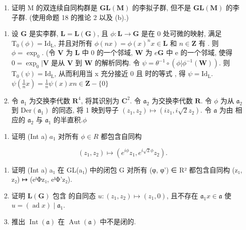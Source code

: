 \begin{enumerate}
\def\labelenumi{(\alph{enumi})}
\setcounter{enumi}{2}
\tightlist
\item
  证明 M 的双连续自同构群是 \(\mathbf{GL}(\mathbf{M})\) 的李拟子群, 但不是 \(\mathbf{GL}(\mathbf{M})\) 的李子群. (使用命题 18 的推论 2 以及 (b).)
\end{enumerate}

\begin{enumerate}
\def\labelenumi{\arabic{enumi}.}
\setcounter{enumi}{12}
\item
  设 \(\mathbf{G}\) 是实李群, \(\mathbf{L} = \mathbf{L}(\mathbf{G})\), 且 \(\phi: \mathbf{L} \to \mathbf{G}\) 是在 0 处可微的映射, 满足 \(\mathrm{T}_0(\phi) = \mathrm{Id}_{\mathrm{L}}\), 并且对所有 \(\phi(nx) = \phi(x)^n\)\(x \in \mathbf{L}\) 和 \(n \in \mathbf{Z}\) 有 . 则 \(\phi = \exp_0\). (令 \(\mathbf{V}\) 为 \(\mathbf{L}\) 中 0 的一个邻域, \(\mathbf{W}\) 为 \(e\)\(\mathbf{G}\) 中 e 的一个邻域, 使得 \(0 = \exp_0 | \mathbf{V}\) 是从 \(\mathbf{V}\) 到 \(\mathbf{W}\) 的解析同构. 令 \(\psi = \theta^{-1} \circ (\phi | \phi^{-1}(\mathbf{W}))\). 则 \(\mathrm{T}_0(\psi) = \mathrm{Id}_{\mathrm{L}}\), 从而利用当 x 充分接近 0 且  时的等式 , 得 \(\psi = \mathrm{Id}_{\mathrm{L}}\).\(\psi\left(\frac{1}{n}x\right) = \frac{1}{n}\psi(x)\)\(x\)\(n \in \mathbf{Z} - \{0\}\)
\item
  令 \(\mathfrak{a}_1\) 为交换李代数 \(\mathbf{R}^4\), 将其识别为 \(\mathbf{C}^2\). 令 \(\mathfrak{a}_2\) 为交换李代数 \(\mathbf{R}\). 令 \(\phi\) 为从 \(\mathfrak{a}_2\) 到 \(\mathrm{Der}(\mathfrak{a}_1)\) 的同态, 将 1 映到导子 \((z_1, z_2) \mapsto (iz_1, i\sqrt{2}z_2)\). 令 \(\mathfrak{a}\) 为由  相应的 \(\mathfrak{a}_2\) 与 \(\mathfrak{a}_1\) 的半直积.\(\phi\)
\end{enumerate}

\begin{enumerate}
\def\labelenumi{(\alph{enumi})}
\tightlist
\item
  证明 (Int a) \textbar{} \(a_{1}\) 对所有 \(\phi \in R\) 都包含自同构
\end{enumerate}

\[
\left(z _ {1}, z _ {2}\right) \mapsto \left(e ^ {i \phi} z _ {1}, e ^ {i \sqrt {2} \phi} z _ {2}\right).
\]

\begin{enumerate}
\def\labelenumi{(\alph{enumi})}
\setcounter{enumi}{1}
\item
  证明 (Int a) \textbar{} a₁ 在 GL(a₁) 中的闭包 G 对所有 (φ, φ') ∈ R² 都包含自同构 (z₁, z₂) ↦ (eⁱΦz₁, eⁱΦ'z₂).
\item
  证明 \(\mathbf{L}(\mathbf{G})\) 包含  的自同态 \(u: (z_1, z_2) \mapsto (z_1, 0)\), 且不存在 \(\mathfrak{a}_1\)\(x \in \mathfrak{a}\) 使 \(u = (\operatorname{ad} x) \mid \mathfrak{a}_1\).
\item
  推出 \(\operatorname{Int}(\mathfrak{a})\) 在 \(\operatorname{Aut}(\mathfrak{a})\) 中不是闭的.
\end{enumerate}

